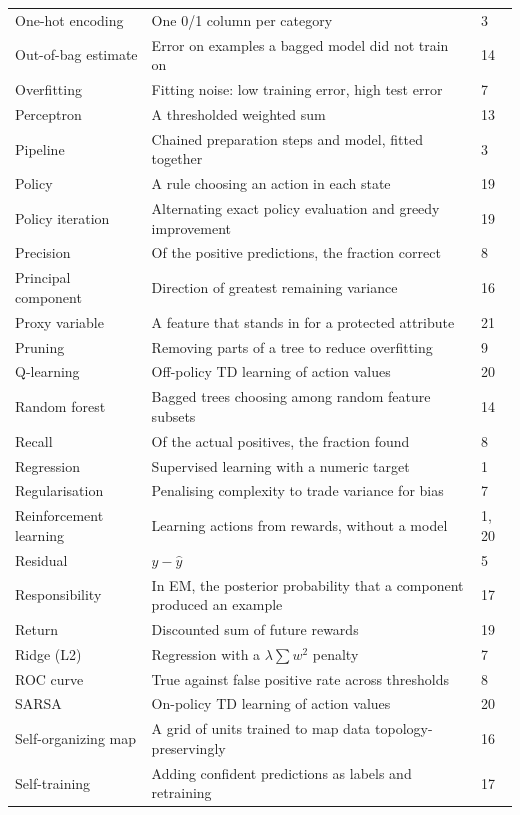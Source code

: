 \begin{longtable}{@{}L{3.9cm}L{9.9cm}L{1.1cm}@{}}
One-hot encoding & One 0/1 column per category & 3 \\
Out-of-bag estimate & Error on examples a bagged model did not train on & 14 \\
Overfitting & Fitting noise: low training error, high test error & 7 \\
Perceptron & A thresholded weighted sum & 13 \\
Pipeline & Chained preparation steps and model, fitted together & 3 \\
Policy & A rule choosing an action in each state & 19 \\
Policy iteration & Alternating exact policy evaluation and greedy improvement & 19 \\
Precision & Of the positive predictions, the fraction correct & 8 \\
Principal component & Direction of greatest remaining variance & 16 \\
Proxy variable & A feature that stands in for a protected attribute & 21 \\
Pruning & Removing parts of a tree to reduce overfitting & 9 \\
Q-learning & Off-policy TD learning of action values & 20 \\
Random forest & Bagged trees choosing among random feature subsets & 14 \\
Recall & Of the actual positives, the fraction found & 8 \\
Regression & Supervised learning with a numeric target & 1 \\
Regularisation & Penalising complexity to trade variance for bias & 7 \\
Reinforcement learning & Learning actions from rewards, without a model & 1, 20 \\
Residual & $y - \hat{y}$ & 5 \\
Responsibility & In EM, the posterior probability that a component produced an example & 17 \\
Return & Discounted sum of future rewards & 19 \\
Ridge (L2) & Regression with a $\lambda\sum w^2$ penalty & 7 \\
ROC curve & True against false positive rate across thresholds & 8 \\
SARSA & On-policy TD learning of action values & 20 \\
Self-organizing map & A grid of units trained to map data topology-preservingly & 16 \\
Self-training & Adding confident predictions as labels and retraining & 17 \\

\end{longtable}

